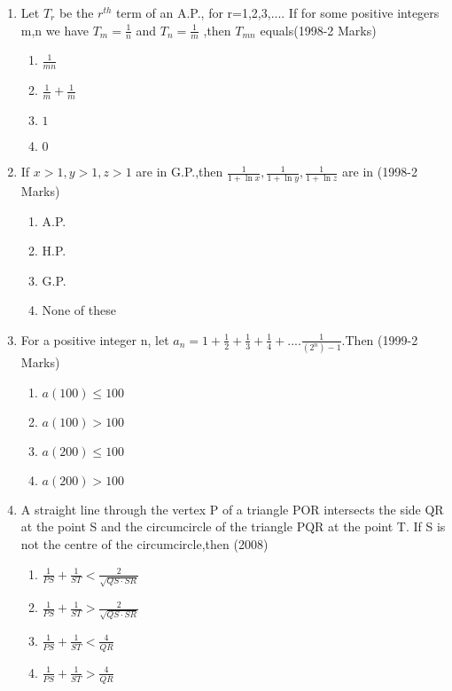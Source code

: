 \documentclass[journal,12pt,twocolumn]{IEEEtran}
\theoremstyle{remark}
\begin{document}
\begin{enumerate}
\item Let $T_r$ be the $r^{th}$ term of an A.P., for r=1,2,3,.... If for some positive integers m,n we have
$T_m=\frac{1}{n}$ and $T_n=\frac{1}{m}$ ,then $T_{mn}$ equals\hfill{(1998-2 Marks)}
\begin{multicols}{2}
\begin{enumerate}
\item $\frac{1}{mn}$
\item $\frac{1}{m} + \frac{1}{m}$
\item $1$
\item $0$
\end{enumerate}
\end{multicols}

\item If $x>1,y>1,z>1$ are in G.P.,then $\frac{1}{1+\ln x},\frac{1}{1+\ln y},\frac{1}{1+\ln z}$ are in 
\hfill{(1998-2 Marks)}
\begin{multicols}{2}
\begin{enumerate}
\item A.P.
\item H.P.
\item G.P.
\item None of these
\end{enumerate}
\end{multicols}

\item For a positive integer n, let
$a_n=1+\frac{1}{2}+\frac{1}{3}+\frac{1}{4}+....\frac{1}{(2^n)-1}$.Then \hfill{(1999-2 Marks)}
\begin{multicols}{2}
\begin{enumerate}
\item $a(100)\leq 100$
\item $a(100) > 100$
\item $a(200)\leq 100$
\item $a(200) > 100$
\end{enumerate}
\end{multicols}

\item A straight line through the vertex P of a triangle POR intersects the side QR at the point S and the circumcircle of the triangle PQR at the point T. If S is not the centre of the circumcircle,then  \hfill{(2008)}
\begin{multicols}{2}
\begin{enumerate}
\item $\frac{1}{PS}+\frac{1}{ST}<\frac{2}{\sqrt{QS \cdot SR}}$
\item $\frac{1}{PS}+\frac{1}{ST}>\frac{2}{\sqrt{QS \cdot SR}}$
\item $\frac{1}{PS}+\frac{1}{ST}<\frac{4}{QR}$
\item $\frac{1}{PS}+\frac{1}{ST}>\frac{4}{QR}$
\end{enumerate}
\end{multicols}


\end{enumerate}
\end{document}
